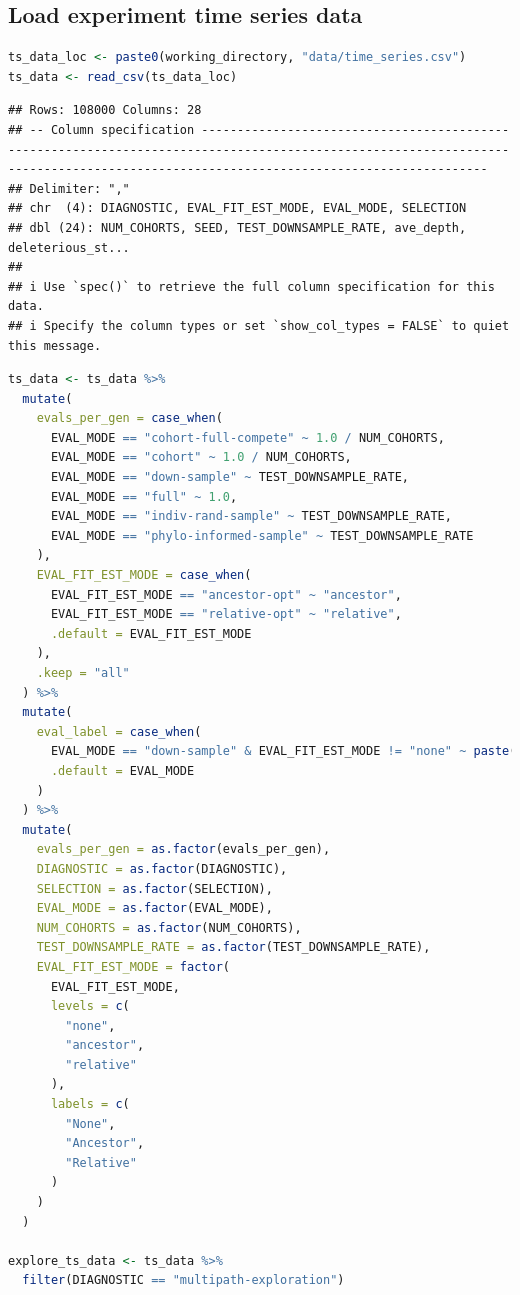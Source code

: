 \documentclass[
]{book}
\begin{document}
\hypertarget{load-experiment-time-series-data-2}{%
\subsection{Load experiment time series data}\label{load-experiment-time-series-data-2}}

\begin{lstlisting}[language=R]
ts_data_loc <- paste0(working_directory, "data/time_series.csv")
ts_data <- read_csv(ts_data_loc)
\end{lstlisting}

\begin{lstlisting}
## Rows: 108000 Columns: 28
## -- Column specification ------------------------------------------------------------------------------------------------------------------------------------------------------------------------------------
## Delimiter: ","
## chr  (4): DIAGNOSTIC, EVAL_FIT_EST_MODE, EVAL_MODE, SELECTION
## dbl (24): NUM_COHORTS, SEED, TEST_DOWNSAMPLE_RATE, ave_depth, deleterious_st...
## 
## i Use `spec()` to retrieve the full column specification for this data.
## i Specify the column types or set `show_col_types = FALSE` to quiet this message.
\end{lstlisting}

\begin{lstlisting}[language=R]
ts_data <- ts_data %>%
  mutate(
    evals_per_gen = case_when(
      EVAL_MODE == "cohort-full-compete" ~ 1.0 / NUM_COHORTS,
      EVAL_MODE == "cohort" ~ 1.0 / NUM_COHORTS,
      EVAL_MODE == "down-sample" ~ TEST_DOWNSAMPLE_RATE,
      EVAL_MODE == "full" ~ 1.0,
      EVAL_MODE == "indiv-rand-sample" ~ TEST_DOWNSAMPLE_RATE,
      EVAL_MODE == "phylo-informed-sample" ~ TEST_DOWNSAMPLE_RATE
    ),
    EVAL_FIT_EST_MODE = case_when(
      EVAL_FIT_EST_MODE == "ancestor-opt" ~ "ancestor",
      EVAL_FIT_EST_MODE == "relative-opt" ~ "relative",
      .default = EVAL_FIT_EST_MODE
    ),
    .keep = "all"
  ) %>%
  mutate(
    eval_label = case_when(
      EVAL_MODE == "down-sample" & EVAL_FIT_EST_MODE != "none" ~ paste("down-sample", EVAL_FIT_EST_MODE, sep="-"),
      .default = EVAL_MODE
    )
  ) %>%
  mutate(
    evals_per_gen = as.factor(evals_per_gen),
    DIAGNOSTIC = as.factor(DIAGNOSTIC),
    SELECTION = as.factor(SELECTION),
    EVAL_MODE = as.factor(EVAL_MODE),
    NUM_COHORTS = as.factor(NUM_COHORTS),
    TEST_DOWNSAMPLE_RATE = as.factor(TEST_DOWNSAMPLE_RATE),
    EVAL_FIT_EST_MODE = factor(
      EVAL_FIT_EST_MODE,
      levels = c(
        "none",
        "ancestor",
        "relative"
      ),
      labels = c(
        "None",
        "Ancestor",
        "Relative"
      )
    )
  )

explore_ts_data <- ts_data %>%
  filter(DIAGNOSTIC == "multipath-exploration")
\end{lstlisting}
\end{document}
